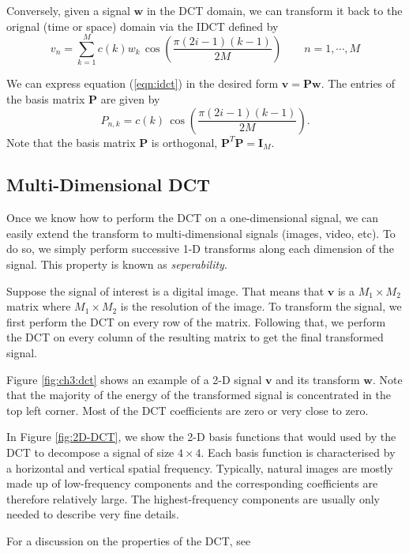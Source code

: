 Conversely, given a signal $\bm w$ in the DCT domain, we can transform it back to the orignal (time or space) domain via the IDCT defined by
\begin{equation}
  \label{eqn:idct}
  v_n = \sum_{k=1}^M c(k) w_k  \, \cos\left(\frac{\pi(2i-1)(k-1)}{2M}\right) \qquad n = 1,\cdots,M
\end{equation}

We can express equation (\ref{eqn:idct}) in the desired form $\bm v=\bm P\bm w$.
The entries of the basis matrix $\bm P$ are given by
\begin{equation}
  \label{eqn:idct_basis}
  P_{n,k} = c(k)\, \cos\left(\frac{\pi(2i-1)(k-1)}{2M}\right).
\end{equation}
Note that the basis matrix $\bm P$ is orthogonal, $\bm P^T\bm P=\bm I_M$.

\subsection{Multi-Dimensional DCT}
Once we know how to perform the DCT on a one-dimensional signal, we can easily extend the transform to multi-dimensional signals (images, video, etc).
To do so, we simply perform successive 1-D transforms along each dimension of the signal.
This property is known as \emph{seperability}.

Suppose the signal of interest is a digital image.
That means that $\bm v$ is a $M_1\times M_2$ matrix where $M_1\times M_2$ is the resolution of the image.
To transform the signal, we first perform the DCT on every row of the matrix.
Following that, we perform the DCT on every column of the resulting matrix to get the final transformed signal.

Figure \ref{fig:ch3:dct} shows an example of a 2-D signal $\bm v$ and its transform $\bm w$.
Note that the majority of the energy of the transformed signal is concentrated in the top left corner.
Most of the DCT coefficients are zero or very close to zero.

In Figure \ref{fig:2D-DCT}, we show the 2-D basis functions that would used by the DCT to decompose a signal of size $4\times 4$.
Each basis function is characterised by a horizontal and vertical spatial frequency.
Typically, natural images are mostly made up of low-frequency components and the corresponding coefficients are therefore relatively large.
The highest-frequency components are usually only needed to describe very fine details.

For a discussion on the properties of the DCT, see \cite{khayam2003}

